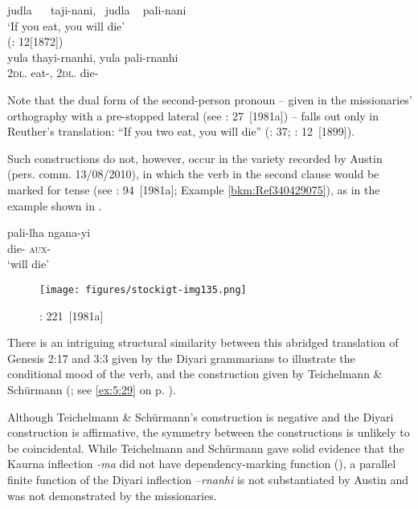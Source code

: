 \newpage
\ea\label{bkm:Ref339728750}
judla ~   ~taji-nani,             ~judla ~              pali-nani\\
\glt    `If you eat, you will die' \\
(\citealt{schoknecht_grammar_1947}: 12[1872]) \\
\gll yula           thayi-rnanhi,   yula                 pali-rnanhi\\
2\textsc{dl}. eat-,     2\textsc{dl}.          die-\\
\z


Note that the dual form of the second-person pronoun – given in the missionaries' orthography with a pre-stopped lateral (see \citet{austin_grammar_2013}: 27~[1981a]) – falls out only in Reuther’s translation: “If you two eat, you will die” (\citeyear{reuther_dieri_1894}: 37; \citeyear{reuther_three_1981}: 12~[1899]).

Such constructions do not, however, occur in the variety recorded by Austin (pers. comm. 13/08/2010), in which the verb in the second clause would be marked for tense (see \citealt{austin_grammar_2013}: 94~[1981a]; Example \ref{bkm:Ref340429075}), as in the example shown in .

\ea
\gll \label{bkm:Ref340429075}pali-lha    ngana-yi\\
die-  \textsc{aux}-\\
\glt `will die' \z

\begin{figure}
\texttt{[image: figures/stockigt-img135.png]}
\caption{\citet{austin_grammar_2013}: 221~[1981a]}
\label{bkm:Ref340429028}\label{fig:key:8-186}
\end{figure}

There is an intriguing structural similarity between this abridged translation of Genesis 2:17 and 3:3 given by the Diyari grammarians to illustrate the conditional mood of the verb, and the construction given by Teichelmann \& Schürmann (\citeyear[V 67]{teichelmann_outlines_1840}; see \ref{ex:5:29} on p. \pageref{ex:5:29}).

Although Teichelmann \& Schürmann’s construction is negative and the Diyari construction is affirmative, the symmetry between the constructions is unlikely to be coincidental. While Teichelmann and Schürmann gave solid evidence that the Kaurna inflection \textit{-ma} did not have dependency-marking function (), a parallel finite function of the Diyari inflection –\textit{rnanhi} is not substantiated by Austin and was not demonstrated by the missionaries.

